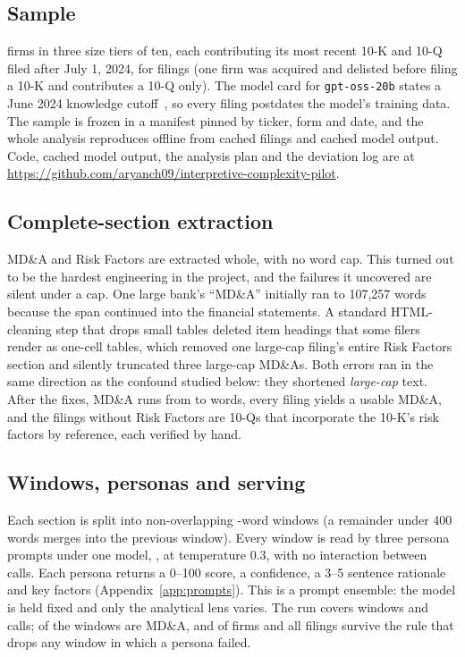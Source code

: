 \documentclass[sigconf,nonacm]{acmart}
\begin{document}
\subsection{Sample}
\NFirms{} firms in three size tiers of ten, each contributing its most recent 10-K and
10-Q filed after July 1, 2024, for \NFilings{} filings (one firm was acquired and delisted
before filing a 10-K and contributes a 10-Q only). The model card for \texttt{gpt-oss-20b}
states a June 2024 knowledge cutoff~\cite{gptoss2025}, so every filing postdates the
model's training data. The sample is frozen in a manifest pinned by ticker, form and
date, and the whole analysis reproduces offline from cached filings and cached model
output. Code, cached model output, the analysis plan and the deviation log are at
\url{https://github.com/aryanch09/interpretive-complexity-pilot}.

\subsection{Complete-section extraction}
MD\&A and Risk Factors are extracted whole, with no word cap. This turned out to be the
hardest engineering in the project, and the failures it uncovered are silent under a
cap. One large bank's ``MD\&A'' initially ran to 107{,}257 words because the span
continued into the financial statements. A standard HTML-cleaning step that drops
small tables deleted item headings that some filers render as one-cell tables, which
removed one large-cap filing's entire Risk Factors section and silently truncated
three large-cap MD\&As. Both errors ran in the same direction as the confound studied
below: they shortened \emph{large-cap} text. After the fixes, MD\&A runs from
\MdaWordsMin{} to \MdaWordsMax{} words, every filing yields a usable MD\&A, and the
\NFilingsNoRisk{} filings without Risk Factors are 10-Qs that incorporate the 10-K's
risk factors by reference, each verified by hand.

\subsection{Windows, personas and serving}
Each section is split into non-overlapping \ChunkWords-word windows (a remainder under
400 words merges into the previous window). Every window is read by three persona
prompts under one model, \ModelName, at temperature 0.3, with no interaction between
calls. Each persona returns a 0--100 score, a confidence, a 3--5 sentence rationale and
key factors (Appendix~\ref{app:prompts}). This is a prompt ensemble: the model is held
fixed and only the analytical lens varies. The run covers \NWindows{} windows and
\NCalls{} calls; \NWindowsMDA{} of the windows are MD\&A, and \NFirms{} of \NFirms{} firms and
all \NFilings{} filings survive the rule that drops any window in which a persona
failed.
\end{document}
